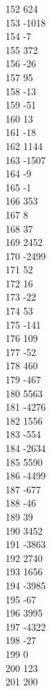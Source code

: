 { 152	624 \\
 153	-1018 \\
 154	-7 \\
 155	372 \\
 156	-26 \\
 157	95 \\
 158	-13 \\
 159	-51 \\
 160	13 \\
 161	-18 \\
 162	1144 \\
 163	-1507 \\
 164	-9 \\
 165	-1 \\
 166	353 \\
 167	8 \\
 168	37 \\
 169	2452 \\
 170	-2499 \\
 171	52 \\
 172	16 \\
 173	-22 \\
 174	53 \\
 175	-141 \\
 176	109 \\
 177	-52 \\
 178	460 \\
 179	-467 \\
 180	5563 \\
 181	-4276 \\
 182	1556 \\
 183	-554 \\
 184	-2634 \\
 185	5590 \\
 186	-4499 \\
 187	-677 \\
 188	-46 \\
 189	39 \\
 190	3452 \\
 191	-3863 \\
 192	2740 \\
 193	1656 \\
 194	-3985 \\
 195	-67 \\
 196	3995 \\
 197	-4322 \\
 198	-27 \\
 199	0 \\
 200	123 \\
 201	200 \\
}
